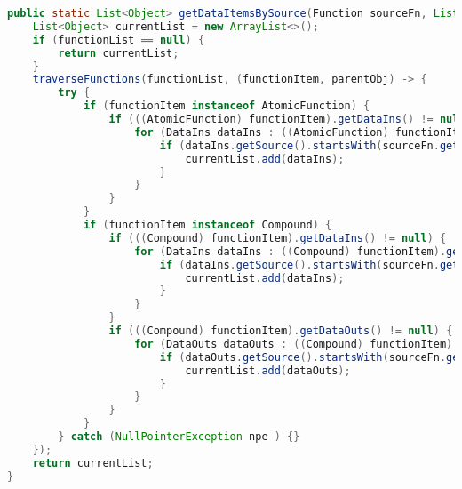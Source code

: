\begin{appendix}
\begin{lstlisting}[language=Java,caption={get data items by source},label={lst:getDataItemsBySource}]
public static List<Object> getDataItemsBySource(Function sourceFn, List<Function> functionList) {
    List<Object> currentList = new ArrayList<>();
    if (functionList == null) {
        return currentList;
    }
    traverseFunctions(functionList, (functionItem, parentObj) -> {
        try {
            if (functionItem instanceof AtomicFunction) {
                if (((AtomicFunction) functionItem).getDataIns() != null) {
                    for (DataIns dataIns : ((AtomicFunction) functionItem).getDataIns()) {
                        if (dataIns.getSource().startsWith(sourceFn.getName() + "/")) {
                            currentList.add(dataIns);
                        }
                    }
                }
            }
            if (functionItem instanceof Compound) {
                if (((Compound) functionItem).getDataIns() != null) {
                    for (DataIns dataIns : ((Compound) functionItem).getDataIns()) {
                        if (dataIns.getSource().startsWith(sourceFn.getName() + "/")) {
                            currentList.add(dataIns);
                        }
                    }
                }
                if (((Compound) functionItem).getDataOuts() != null) {
                    for (DataOuts dataOuts : ((Compound) functionItem).getDataOuts()) {
                        if (dataOuts.getSource().startsWith(sourceFn.getName() + "/")) {
                            currentList.add(dataOuts);
                        }
                    }
                }
            }
        } catch (NullPointerException npe ) {}
    });
    return currentList;
}
\end{lstlisting}

\end{appendix}